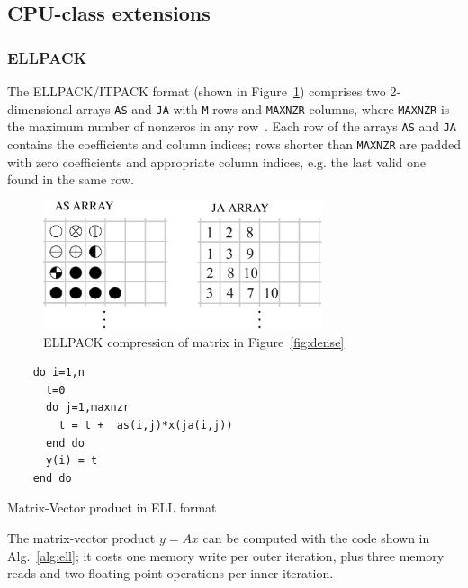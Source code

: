 \subsection{CPU-class extensions}


\subsubsection*{ELLPACK}

The ELLPACK/ITPACK format (shown in Figure~\ref{fig:ell}) 
comprises  two 2-dimensional arrays \verb|AS| and
\verb|JA|  with \verb|M| rows and \verb|MAXNZR| columns, where
\verb|MAXNZR| is the maximum
number of nonzeros in any row~\cite{ELLPACK}. 
Each row of the arrays \verb|AS| and \verb|JA| contains the
coefficients and column indices; rows shorter than
\verb|MAXNZR| are padded with zero coefficients and appropriate column
indices, e.g. the last valid one found in the same row.

\begin{figure}[ht]
	\centering
		\includegraphics[width=8.2cm]{images/ell.pdf}
	\caption{ELLPACK compression of matrix in Figure~\ref{fig:dense}}
	\label{fig:ell}
\end{figure} 


\begin{algorithm}
\lstset{language=Fortran}
\small
  \begin{lstlisting}
    do i=1,n
      t=0
      do j=1,maxnzr
        t = t +  as(i,j)*x(ja(i,j))
      end do
      y(i) = t
    end do
  \end{lstlisting}
  \caption{\label{alg:ell} Matrix-Vector product in ELL format}
\end{algorithm}
The matrix-vector product $y=Ax$ can be computed with the code shown in
Alg.~\ref{alg:ell}; it costs  one  memory write per outer iteration, 
plus three memory reads  and two floating-point operations per inner
iteration.   

